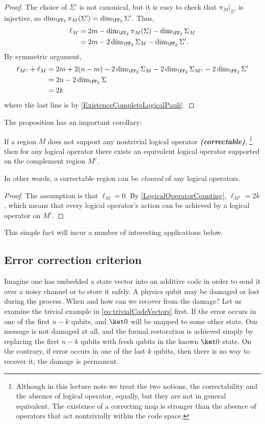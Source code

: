 \begin{proof}
The choice of $\Sigma'$ is not canonical, 
but it is easy to check that $\pi_M |_{\Sigma'}$ is injective,
so $\dim_{\FF_2} \pi_M(\Sigma') = \dim_{\FF_2} \Sigma'$.
Thus,
\begin{align*}
\ell_M 
&= 2m - \dim_{\FF_2} \pi_M (\Sigma) - \dim_{\FF_2} \Sigma_M\\
&= 2m - 2 \dim_{\FF_2} \Sigma_M - \dim_{\FF_2} \Sigma'.
\end{align*}
By symmetric argument,
\begin{align*}
\ell_{M^c} + \ell_M 
&= 2m + 2(n-m) - 2 \dim_{\FF_2} \Sigma_{M} - 2 \dim_{\FF_2} \Sigma_{M^c} - 2 \dim_{\FF_2} \Sigma'\\
&= 2n - 2 \dim_{\FF_2} \Sigma \\
&= 2k
\end{align*}
where the last line is by \ref{ExistenceCompleteLogicalPauli}.
\end{proof}
The proposition has an important corollary:
\begin{thm}
If a region $M$ does not support any nontrivial logical operator {\em \bf (correctable)},%
\footnote{
Although in this lecture note we treat the two notions, 
the correctability and the absence of logical operator,
equally, but they are not in general equivalent.
The existence of a correcting map is stronger than the absence of operators
that act nontrivially within the code space.
}
then for any logical operator there exists an equivalent logical operator
supported on the complement region $M^c$.
\label{CleaningLemma}
\end{thm}
In other words, a correctable region can be {\em cleaned} of any logical operators.
\begin{proof}
The assumption is that $\ell_M = 0$. By \ref{LogicalOperatorCounting},
$\ell_{M^c} = 2k$,
which means that every logical operator's action 
can be achieved by a logical operator on $M^c$.
\end{proof}
This simple fact will incur a number of interesting applications below.

\subsection{Error correction criterion}

Imagine one has embedded a state vector into an additive code 
in order to send it over a noisy channel or to store it safely.
A physics qubit may be damaged or lost during the process.
When and how can we recover from the damage?
Let us examine the trivial example in \eqref{eq:trivialCodeVectors} first.
If the error occurs in one of the first $n-k$ qubits, and $\ket 0$ will be mapped to some other state.
Our message is not damaged at all, and the formal restoration is achieved simply by
replacing the first $n-k$ qubits with fresh qubits in the known $\ket 0$ state.
On the contrary, 
if error occurs in one of the last $k$ qubits, then there is no way to recover it;
the damage is permanent.

